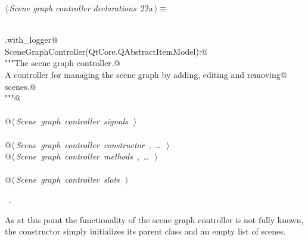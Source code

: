 \documentclass[
    a4paper,      %
    10pt,         %
    openright,    %
    notitlepage,  %
    parskip=half, %
]{scrreprt}       %
\theoremstyle{definition}                    %
\begin{document}
\begin{flushleft} \small
\begin{minipage}{\linewidth}\label{scrap16}\raggedright\small
{} $\langle\,${\itshape Scene graph controller declarations}\nobreak\ {\footnotesize {22a}}$\,\rangle\equiv$
\vspace{-1ex}
\begin{list}{}{} \item
\mbox{}\lstinline@@\\
\mbox{}\lstinline@common.with_logger@\\
\mbox{}\lstinline@class SceneGraphController(QtCore.QAbstractItemModel):@\\
\mbox{}\lstinline@    """The scene graph controller.@\\
\mbox{}\lstinline@    A controller for managing the scene graph by adding, editing and removing@\\
\mbox{}\lstinline@    scenes.@\\
\mbox{}\lstinline@    """@\\
\mbox{}\lstinline@@\\
\mbox{}\lstinline@    @\hbox{$\langle\,${\itshape Scene graph controller signals}\nobreak\ {\footnotesize {}}$\,\rangle$}\lstinline@@\\
\mbox{}\lstinline@@\\
\mbox{}\lstinline@    @\hbox{$\langle\,${\itshape Scene graph controller constructor}\nobreak\ {\footnotesize {}, \ldots\ }$\,\rangle$}\lstinline@@\\
\mbox{}\lstinline@    @\hbox{$\langle\,${\itshape Scene graph controller methods}\nobreak\ {\footnotesize {}, \ldots\ }$\,\rangle$}\lstinline@@\\
\mbox{}\lstinline@@\\
\mbox{}\lstinline@    @\hbox{$\langle\,${\itshape Scene graph controller slots}\nobreak\ {\footnotesize {}}$\,\rangle$}\lstinline@@\\
\mbox{}\lstinline@@{\NWsep}
\end{list}
\vspace{-1.5ex}
\footnotesize
\begin{list}{}{\setlength{\itemsep}{-\parsep}\setlength{\itemindent}{-\leftmargin}}
\item \NWtxtMacroRefIn\ .

\item{}
\end{list}
\end{minipage}\vspace{4ex}
\end{flushleft}
As at this point the functionality of the scene graph controller is not fully
known, the constructor simply initializes its parent class and an empty list of
scenes.
\end{document}

